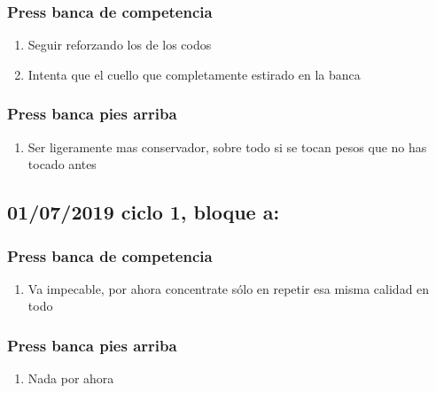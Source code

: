 \documentclass[11pt]{article}
\begin{document}
\subsubsection{Press banca de competencia}
\label{sec:orgceed98e}
\begin{enumerate}
\item Seguir reforzando los de los codos
\item Intenta que el cuello que completamente estirado en la banca
\end{enumerate}
\subsubsection{Press banca pies arriba}
\label{sec:org1819b90}
\begin{enumerate}
\item Ser ligeramente mas conservador, sobre todo si se tocan pesos que
no has tocado antes
\end{enumerate}
\subsection{01/07/2019 ciclo 1, bloque a:}
\label{sec:org2c7e5c2}
\subsubsection{Press banca de competencia}
\label{sec:org338af09}
\begin{enumerate}
\item Va impecable, por ahora concentrate sólo en repetir esa misma
calidad en todo
\end{enumerate}
\subsubsection{Press banca pies arriba}
\label{sec:org5967972}
\begin{enumerate}
\item Nada por ahora
\end{enumerate}
\end{document}
